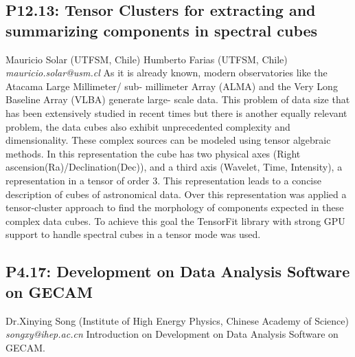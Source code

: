 \documentclass{report}
\begin{document}
\subsection*{P12.13: Tensor Clusters for extracting and summarizing components in spectral cubes}
\bigskip
Mauricio Solar (UTFSM, Chile) \newline Humberto Farias (UTFSM, Chile) \newline   \newline   \newline  \newline  \newline\newline
{\it mauricio.solar@usm.cl}\newline
\newline\newline
As it is already known, modern observatories like the Atacama Large Millimeter/ sub- millimeter Array (ALMA) and the Very Long Baseline Array (VLBA) generate large- scale data. This problem of data size that has been extensively studied in recent times but there is another equally relevant problem, the data cubes also exhibit unprecedented complexity and dimensionality. These complex sources can be modeled using tensor algebraic methods. In this representation the cube has two physical axes (Right ascension(Ra)/Declination(Dec)), and a third axis (Wavelet, Time, Intensity), a representation in a tensor of order 3. This representation leads to a concise description of cubes of astronomical data. Over this representation was applied​ a tensor-cluster approach to find the morphology of components expected in these complex data cubes. To achieve this goal the TensorFit library with strong GPU support to handle spectral cubes in a tensor mode was used.\newline
\newpage
\subsection*{P4.17: Development on Data Analysis Software on GECAM}
\bigskip
Dr.Xinying Song (Institute of High Energy Physics, Chinese Academy of Science) \newline   \newline   \newline   \newline  \newline  \newline\newline
{\it songxy@ihep.ac.cn}\newline
\newline\newline
Introduction on Development on Data Analysis Software on GECAM.\newline
\newpage
\end{document}
